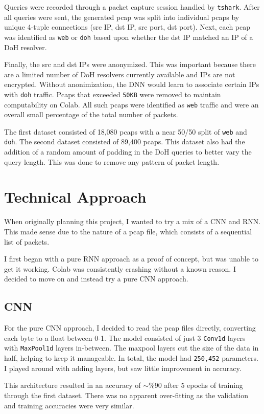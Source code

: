 \documentclass[fleqn,11pt]{article}
\begin{document}
Queries were recorded through a packet capture session handled by \texttt{tshark}.
After all queries were sent, the generated pcap was split into individual pcaps by unique 4-tuple connections (src IP, dst IP, src port, dst port). 
Next, each pcap was identified as \texttt{web} or \texttt{doh} based upon whether the dst IP matched an IP of a DoH resolver. 

Finally, the src and dst IPs were anonymized. 
This was important because there are a limited number of DoH resolvers currently available and IPs are not encrypted. 
Without anonimization, the DNN would learn to associate certain IPs with \texttt{doh} traffic.
Pcaps that exceeded \texttt{50KB} were removed to maintain computability on Colab. 
All such pcaps were identified as \texttt{web} traffic and were an overall small percentage of the total number of packets.

The first dataset consisted of 18,080 pcaps with a near 50/50 split of \texttt{web} and \texttt{doh}. 
The second dataset consisted of 89,400 pcaps. 
This dataset also had the addition of a random amount of padding in the DoH queries to better vary the query length. 
This was done to remove any pattern of packet length.


\section{Technical Approach}
When originally planning this project, I wanted to try a mix of a CNN and RNN.
This made sense due to the nature of a pcap file, which consists of a sequential list of packets.

I first began with a pure RNN approach as a proof of concept, but was unable to get it working.
Colab was consistently crashing without a known reason.
I decided to move on and instead try a pure CNN approach.

\subsection{CNN}
For the pure CNN approach, I decided to read the pcap files directly, converting each byte to a float between 0-1. 
The model consisted of just 3 \texttt{Conv1d} layers with \texttt{MaxPool1d} layers in-between.
The maxpool layers cut the size of the data in half, helping to keep it manageable.
In total, the model had \texttt{250,452} parameters. 
I played around with adding layers, but saw little improvement in accuracy. 

This architecture resulted in an accuracy of $\sim\%90$ after 5 epochs of training through the first dataset.
There was no apparent over-fitting as the validation and training accuracies were very similar.
\end{document}
